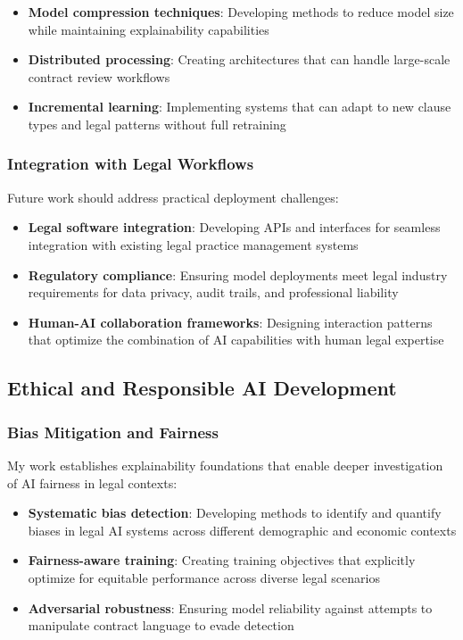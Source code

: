 \begin{itemize}
\item \textbf{Model compression techniques}: Developing methods to reduce model size while maintaining explainability capabilities
\item \textbf{Distributed processing}: Creating architectures that can handle large-scale contract review workflows
\item \textbf{Incremental learning}: Implementing systems that can adapt to new clause types and legal patterns without full retraining
\end{itemize}

\subsubsection{Integration with Legal Workflows}
Future work should address practical deployment challenges:

\begin{itemize}
\item \textbf{Legal software integration}: Developing APIs and interfaces for seamless integration with existing legal practice management systems
\item \textbf{Regulatory compliance}: Ensuring model deployments meet legal industry requirements for data privacy, audit trails, and professional liability
\item \textbf{Human-AI collaboration frameworks}: Designing interaction patterns that optimize the combination of AI capabilities with human legal expertise
\end{itemize}

\subsection{Ethical and Responsible AI Development}
\label{subsec:ethical_development}

\subsubsection{Bias Mitigation and Fairness}
My work establishes explainability foundations that enable deeper investigation of AI fairness in legal contexts:

\begin{itemize}
\item \textbf{Systematic bias detection}: Developing methods to identify and quantify biases in legal AI systems across different demographic and economic contexts
\item \textbf{Fairness-aware training}: Creating training objectives that explicitly optimize for equitable performance across diverse legal scenarios
\item \textbf{Adversarial robustness}: Ensuring model reliability against attempts to manipulate contract language to evade detection
\end{itemize}

